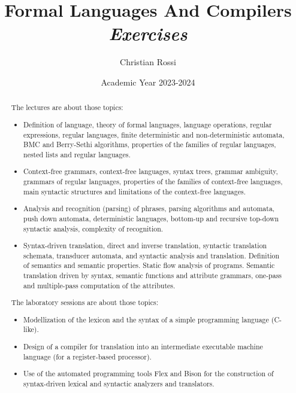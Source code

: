 \documentclass[12pt, a4paper]{report}
\title{Formal Languages And Compilers \\ \textit{Exercises}}
\author{Christian Rossi}
\date{Academic Year 2023-2024}
\newtheorem[style=M,bodystyle=\normalfont]{theorem}{Theorem}
\newtheorem[style=M,bodystyle=\normalfont]{corollary}{Corollary}
\newtheorem[style=M,bodystyle=\normalfont]{lemma}{Lemma}
\newtheorem[style=M,bodystyle=\normalfont]{definition}{Definition}
\begin{document}
\maketitle

\newpage

\begin{abstract}
    The lectures are about those topics: 
    \begin{itemize}
        \item Definition of language, theory of formal languages, language operations, regular expressions, regular languages, finite deterministic and non-deterministic automata, 
            BMC and Berry-Sethi algorithms, properties of the families of regular languages, nested lists and regular languages.
        \item Context-free grammars, context-free languages, syntax trees, grammar ambiguity, grammars of regular languages, properties of the families of context-free languages, 
            main syntactic structures and limitations of the context-free languages.
        \item Analysis and recognition (parsing) of phrases, parsing algorithms and automata, push down automata, deterministic languages, bottom-up and recursive top-down syntactic 
            analysis, complexity of recognition.
        \item Syntax-driven translation, direct and inverse translation, syntactic translation schemata, transducer automata, and syntactic analysis and translation. Definition of 
            semantics and semantic properties. Static flow analysis of programs. Semantic translation driven by syntax, semantic functions and attribute grammars, one-pass and 
            multiple-pass computation of the attributes.
    \end{itemize}
    The laboratory sessions are about those topics: 
    \begin{itemize}
        \item Modellization of the lexicon and the syntax of a simple programming language (C-like).
        \item Design of a compiler for translation into an intermediate executable machine language (for a register-based processor).
        \item Use of the automated programming tools Flex and Bison for the construction of syntax-driven lexical and syntactic analyzers and translators.
    \end{itemize}
\end{abstract}
\end{document}
